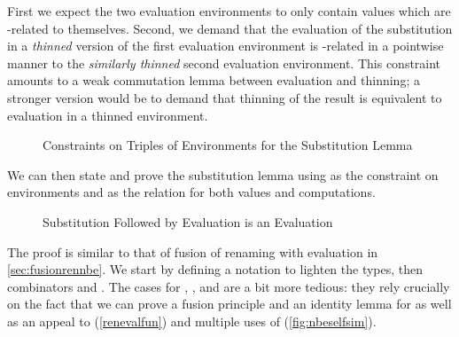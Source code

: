 First we expect the two evaluation environments to only contain  values
which are -related to themselves. Second, we demand that the evaluation of
the substitution in a \emph{thinned} version of the first evaluation environment
is -related in a pointwise manner to the \emph{similarly thinned}
second evaluation environment. This constraint amounts to a weak commutation lemma
between evaluation and thinning; a stronger version would be to demand that thinning
of the result is equivalent to evaluation in a thinned environment.

\begin{figure}[h]
\caption{Constraints on Triples of Environments for the Substitution Lemma}
\end{figure}

We can then state and prove the substitution lemma using  as the constraint
on environments and  as the relation for both values and computations.

\begin{figure}[h]
\caption{Substitution Followed by Evaluation is an Evaluation}
\end{figure}

The proof is similar to that of fusion of renaming with evaluation in
\cref{sec:fusionrennbe}. We start by defining a notation  to lighten
the types, then combinators  and . The cases for
, , and  are a bit more tedious:
they rely crucially on the fact that we can prove a fusion principle and an identity
lemma for  as well as an appeal to 
(\cref{renevalfun}) and multiple uses of 
(\cref{fig:nbeselfsim}).
